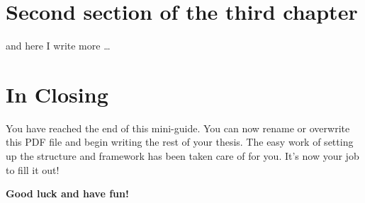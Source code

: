 \kant[8]

\section{Second section of the third chapter}
and here I write more \dots

\kant[10-12]

\section{In Closing}

You have reached the end of this mini-guide. You can now rename or overwrite this PDF file and begin writing the rest of your thesis. The easy work of setting up the structure and framework has been taken care of for you. It's now your job to fill it out!

\vspace{\baselineskip}

\begin{center}\Large\bfseries
Good luck and have fun!
\end{center}
